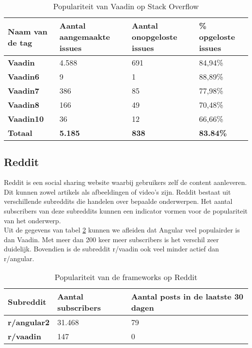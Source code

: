 \begin{table}[H]
	\begin{tabular}{|l|l|l|l|}
		\hline
		Naam van de tag   & \textbf{Aantal aangemaakte issues} & \textbf{Aantal onopgeloste issues} & \textbf{\% opgeloste issues} \\ \hline
		\textbf{Vaadin}  & 4.588                            & 691                             & 84,94\%                              \\ \hline
		\textbf{Vaadin6} & 9                              & 1                              & 88,89\%                              \\ \hline
		\textbf{Vaadin7} & 386                              & 85                              & 77,98\%                              \\ \hline
		\textbf{Vaadin8} & 166                                & 49                                & 70,48\%                              \\ \hline
		\textbf{Vaadin10} & 36                                & 12                                & 66,66\%                              \\ \hline
		\textbf{Totaal}   & \textbf{5.185}                   & \textbf{838}                    & \textbf{83.84\%}                     \\ \hline
	\end{tabular}
	\caption{Populariteit van Vaadin op Stack Overflow}
	\label{table:vaadinstackoverflow}
\end{table}

\subsection{Reddit}
Reddit is een social sharing website waarbij gebruikers zelf de content aanleveren. Dit kunnen zowel artikels als afbeeldingen of video's zijn. Reddit bestaat uit verschillende subreddits die handelen over bepaalde onderwerpen. Het aantal subscribers van deze subreddits kunnen een indicator vormen voor de populariteit van het onderwerp.\\

Uit de gegevens van tabel \ref{table:reddit} kunnen we afleiden dat Angular veel populairder is dan Vaadin. Met meer dan 200 keer meer subscribers is het verschil zeer duidelijk. Bovendien is de subreddit r/vaadin ook veel minder actief dan r/angular.
\begin{table}[H]
	\begin{tabular}{|l|l|l|}
		\hline
		\textbf{Subreddit}  & \textbf{Aantal subscribers} & \textbf{Aantal posts in de laatste 30 dagen} \\ \hline
		\textbf{r/angular2} & 31.468                      & 79                                           \\ \hline
		\textbf{r/vaadin}   & 147                         & 0                                            \\ \hline
	\end{tabular}
	\caption{Populariteit van de frameworks op Reddit}
	\label{table:reddit}
\end{table}

